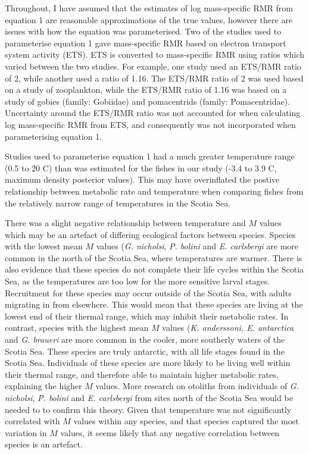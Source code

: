\documentclass[12pt, titlepage]{article}
\begin{document}
Throughout, I have assumed that the estimates of log mass-specific RMR from equation 1 are reasonable approximations of the true values, however there are issues with how the equation was parameterised.
Two of the studies used to parameterise equation 1 gave mass-specific RMR based on electron transport system activity (ETS).
ETS is converted to mass-specific RMR using ratios which varied between the two studies.
For example, one study used an ETS/RMR ratio of 2, %
while another used a ratio of 1.16. %
The ETS/RMR ratio of 2 was used based on a study of zooplankton, %
while the ETS/RMR ratio of 1.16 was based on a study of gobies (family: Gobiidae) and pomacentrids (family: Pomacentridae). %
Uncertainty around the ETS/RMR ratio was not accounted for when calculating log mass-specific RMR from ETS, and consequently was not incorporated when parameterising equation 1.

Studies used to parameterise equation 1 had a much greater temperature range (0.5 to 20 \textdegree C) than was estimated for the fishes in our study (-3.4 to 3.9 \textdegree C, maximum density posterior values).
This may have overinflated the postive relationship between metabolic rate and temperature when comparing fishes from the relatively narrow range of temperatures in the Scotia Sea.

There was a slight negative relationship between temperature and $M$ values which may be an artefact of differing ecological factors between species.
Species with the lowest mean $M$ values (\textit{G. nicholsi}, \textit{P. bolini} and \textit{E. carlsbergi} are more common in the north of the Scotia Sea, %
where temperatures are warmer.
There is also evidence that these species do not complete their life cycles within the Scotia Sea, as the temperatures are too low for the more sensitive larval stages.
Recruitment for these species may occur outside of the Scotia Sea, with adults migrating in from elsewhere. %
This would mean that these species are living at the lowest end of their thermal range, which may inhibit their metabolic rates. %
In contrast, species with the highest mean $M$ values (\textit{K. anderssoni, E. antarctica} and \textit{G. braueri} are more common in the cooler, more southerly waters of the Scotia Sea.
These species are truly antarctic, with all life stages found in the Scotia Sea.
Individuals of these species are more likely to be living well within their thermal range, and therefore able to maintain higher metabolic rates, explaining the higher $M$ values.
More research on otoliths from individuals of \textit{G. nicholsi}, \textit{P. bolini} and \textit{E. carlsbergi} from sites north of the Scotia Sea would be needed to to confirm this theory. 
Given that temperature was not significantly correlated with $M$ values within any species, and that species captured the most variation in $M$ values, it seems likely that any negative correlation between species is an artefact.
\end{document}
